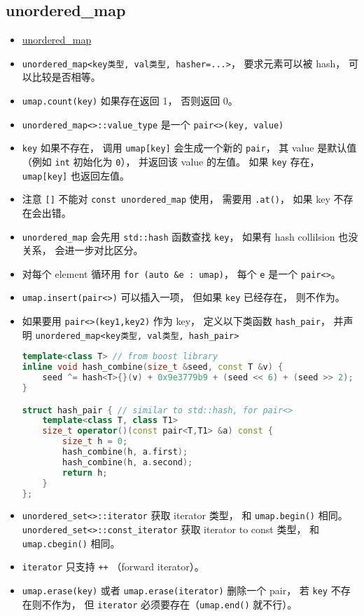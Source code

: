 \subsection{unordered\_map}
\begin{itemize}
\item \href{https://cplusplus.com/reference/unordered_map/unordered_map/}{unordered\_map}
\item \verb`unordered_map<key类型, val类型, hasher=...>`， 要求元素可以被 hash， 可以比较是否相等。
\item \verb`umap.count(key)` 如果存在返回 1， 否则返回 0。
\item \verb`unordered_map<>::value_type` 是一个 \verb`pair<>(key, value)`
\item \verb`key` 如果不存在， 调用 \verb`umap[key]` 会生成一个新的 \verb`pair`， 其 value 是默认值 （例如 \verb`int` 初始化为 \verb`0`）， 并返回该 value 的左值。 如果 \verb`key` 存在， \verb`umap[key]` 也返回左值。
\item 注意 \verb`[]` 不能对 \verb`const unordered_map` 使用， 需要用 \verb`.at()`， 如果 key 不存在会出错。
\item \verb`unordered_map` 会先用 \verb`std::hash` 函数查找 \verb`key`， 如果有 hash collilsion 也没关系， 会进一步对比区分。
\item 对每个 element 循环用 \verb`for (auto &e : umap)`， 每个 \verb`e` 是一个 \verb`pair<>`。
\item \verb`umap.insert(pair<>)` 可以插入一项， 但如果 \verb`key` 已经存在， 则不作为。
\item 如果要用 \verb`pair<>(key1,key2)` 作为 key， 定义以下类函数 \verb`hash_pair`， 并声明 \verb`unordered_map<key类型, val类型, hash_pair>`
\begin{lstlisting}[language=cpp]
template<class T> // from boost library
inline void hash_combine(size_t &seed, const T &v) {
    seed ^= hash<T>{}(v) + 0x9e3779b9 + (seed << 6) + (seed >> 2);
}

struct hash_pair { // similar to std::hash, for pair<>
    template<class T, class T1>
    size_t operator()(const pair<T,T1> &a) const {
        size_t h = 0;
        hash_combine(h, a.first);
        hash_combine(h, a.second);
        return h;
    }
};
\end{lstlisting}
\item \verb`unordered_set<>::iterator` 获取 iterator 类型， 和 \verb`umap.begin()` 相同。 \verb`unordered_set<>::const_iterator` 获取 iterator to const 类型， 和 \verb`umap.cbegin()` 相同。
\item \verb`iterator` 只支持 \verb`++` （forward iterator）。
\item \verb`umap.erase(key)` 或者 \verb`umap.erase(iterator)` 删除一个 pair， 若 \verb`key` 不存在则不作为， 但 \verb`iterator` 必须要存在（\verb`umap.end()` 就不行）。
\end{itemize}

